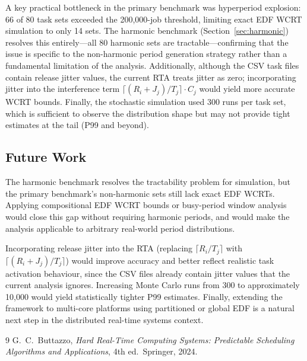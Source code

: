 \documentclass[a4paper,11pt]{article}
\begin{document}
A key practical bottleneck in the primary benchmark was hyperperiod explosion: 66 of 80
task sets exceeded the 200,000-job threshold, limiting exact EDF WCRT simulation to only
14 sets. The harmonic benchmark (Section~\ref{sec:harmonic}) resolves this entirely---all
80 harmonic sets are tractable---confirming that the issue is specific to the non-harmonic
period generation strategy rather than a fundamental limitation of the analysis.
Additionally, although the CSV task files contain release jitter values, the current
RTA treats jitter as zero; incorporating jitter into the interference term
$\lceil (R_i + J_j) / T_j \rceil \cdot C_j$ would yield more accurate WCRT bounds.
Finally, the stochastic simulation used 300 runs per task set, which is sufficient
to observe the distribution shape but may not provide tight estimates at the tail
(P99 and beyond).

\subsection{Future Work}

The harmonic benchmark resolves the tractability problem for simulation, but the primary
benchmark's non-harmonic sets still lack exact EDF WCRTs. Applying compositional EDF
WCRT bounds or busy-period window analysis would close this gap without requiring
harmonic periods, and would make the analysis applicable to arbitrary real-world period
distributions.

Incorporating release jitter into the RTA (replacing $\lceil R_i/T_j \rceil$ with
$\lceil (R_i + J_j)/T_j \rceil$) would improve accuracy and better reflect realistic
task activation behaviour, since the CSV files already contain jitter values that the
current analysis ignores. Increasing Monte Carlo runs from 300 to approximately 10,000
would yield statistically tighter P99 estimates. Finally, extending the framework to
multi-core platforms using partitioned or global EDF is a natural next step in the
distributed real-time systems context.

\begin{thebibliography}{9}
G.~C.~Buttazzo,
\textit{Hard Real-Time Computing Systems: Predictable Scheduling Algorithms and Applications},
4th ed.\ Springer, 2024.
\end{thebibliography}
\end{document}
